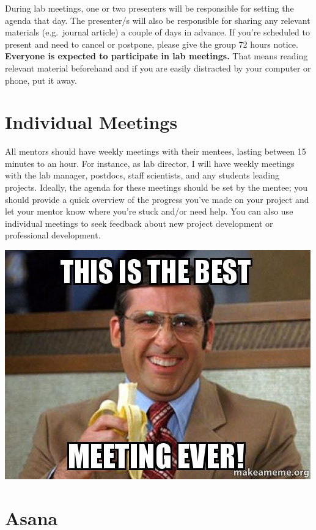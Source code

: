 \documentclass[]{book}
\begin{document}
During lab meetings, one or two presenters will be responsible for setting the agenda that day. The presenter/s will also be responsible for sharing any relevant materials (e.g.~journal article) a couple of days in advance. If you're scheduled to present and need to cancel or postpone, please give the group 72 hours notice. \textbf{Everyone is expected to participate in lab meetings.} That means reading relevant material beforehand and if you are easily distracted by your computer or phone, put it away.

\hypertarget{individual-meetings}{%
\section{Individual Meetings}\label{individual-meetings}}

All mentors should have weekly meetings with their mentees, lasting between 15 minutes to an hour. For instance, as lab director, I will have weekly meetings with the lab manager, postdocs, staff scientists, and any students leading projects. Ideally, the agenda for these meetings should be set by the mentee; you should provide a quick overview of the progress you've made on your project and let your mentor know where you're stuck and/or need help. You can also use individual meetings to seek feedback about new project development or professional development.

\includegraphics{images/best_meeting.jpg}

\hypertarget{asana}{%
\section{Asana}\label{asana}}
\end{document}
